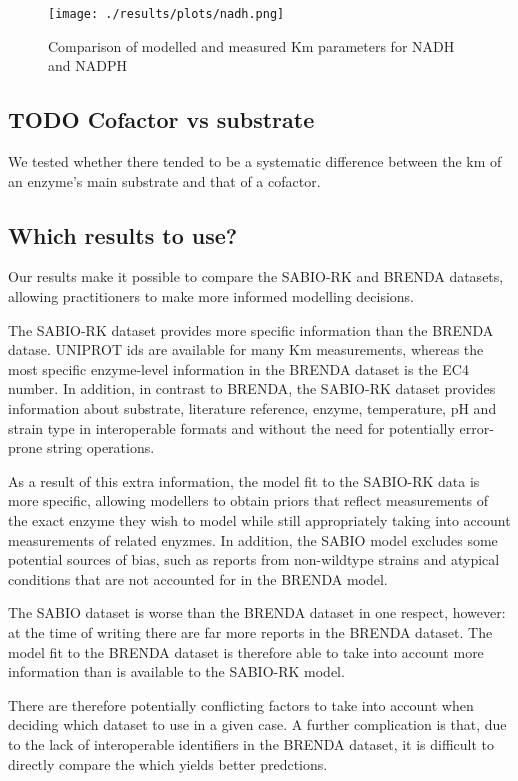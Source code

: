 \documentclass[11pt]{article}
\begin{document}
\begin{figure}[htbp]
\centering
\texttt{[image: ./results/plots/nadh.png]}
\caption{\label{fig:org9607c60}Comparison of modelled and measured Km parameters for NADH and NADPH}
\end{figure}

\subsection{{\bfseries\sffamily TODO} Cofactor vs substrate}
\label{sec:org67134da}
We tested whether there tended to be a systematic difference between the km of
an enzyme's main substrate and that of a cofactor. 

\subsection{Which results to use?}
\label{sec:orga31f699}

Our results make it possible to compare the SABIO-RK and BRENDA datasets,
allowing practitioners to make more informed modelling decisions.

The SABIO-RK dataset provides more specific information than the BRENDA
datase. UNIPROT ids are available for many Km measurements, whereas the most
specific enzyme-level information in the BRENDA dataset is the EC4 number. In
addition, in contrast to BRENDA, the SABIO-RK dataset provides information about
substrate, literature reference, enzyme, temperature, pH and strain type in
interoperable formats and without the need for potentially error-prone string
operations.

As a result of this extra information, the model fit to the SABIO-RK data is
more specific, allowing modellers to obtain priors that reflect measurements of
the exact enzyme they wish to model while still appropriately taking into
account measurements of related enyzmes. In addition, the SABIO model excludes
some potential sources of bias, such as reports from non-wildtype strains and
atypical conditions that are not accounted for in the BRENDA model.

The SABIO dataset is worse than the BRENDA dataset in one respect, however: at
the time of writing there are far more reports in the BRENDA dataset. The model
fit to the BRENDA dataset is therefore able to take into account more
information than is available to the SABIO-RK model.

There are therefore potentially conflicting factors to take into account when
deciding which dataset to use in a given case. A further complication is that,
due to the lack of interoperable identifiers in the BRENDA dataset, it is
difficult to directly compare the which yields better predctions.
\end{document}
